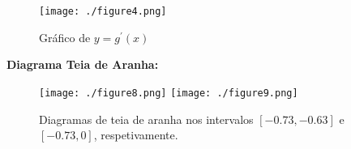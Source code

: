 \documentclass{article}
\begin{document}
\begin{figure}[H]
  \begin{center}
    \texttt{[image: ./figure4.png]}
    \caption{Gráfico de $y=g^{'}(x)$}
  \end{center}
\end{figure}
\textbf{Diagrama Teia de Aranha:}
\begin{figure}[H]
  \begin{center}
    \texttt{[image: ./figure8.png]}
    \texttt{[image: ./figure9.png]}
    \caption{Diagramas de teia de aranha nos intervalos $[-0.73,-0.63]$ e $[-0.73,0]$, respetivamente.}
  \end{center}
\end{figure}
\end{document}
